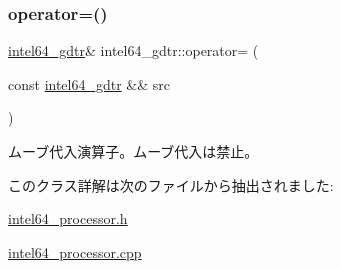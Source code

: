 \subsubsection{\texorpdfstring{operator=()}{operator=()}\hspace{0.1cm}{\footnotesize\ttfamily [2/2]}}
{\footnotesize\ttfamily \hyperlink{classintel64__gdtr}{intel64\+\_\+gdtr}\& intel64\+\_\+gdtr\+::operator= (\begin{DoxyParamCaption}\item[{const \hyperlink{classintel64__gdtr}{intel64\+\_\+gdtr} \&\&}]{src }\end{DoxyParamCaption})\hspace{0.3cm}{\ttfamily [delete]}}

ムーブ代入演算子。ムーブ代入は禁止。 

このクラス詳解は次のファイルから抽出されました\+:\begin{DoxyCompactItemize}
\item 
\hyperlink{intel64__processor_8h}{intel64\+\_\+processor.\+h}\item 
\hyperlink{intel64__processor_8cpp}{intel64\+\_\+processor.\+cpp}\end{DoxyCompactItemize}
